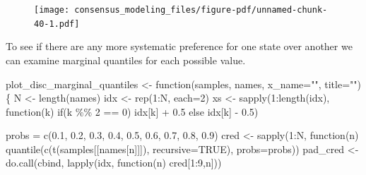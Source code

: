 \documentclass[
  letterpaper,
  DIV=11,
  numbers=noendperiod]{scrartcl}
\newenvironment{Shaded}{\begin{snugshade}}{\end{snugshade}}
\newcommand{\AttributeTok}[1]{\textcolor[rgb]{0.40,0.45,0.13}{#1}}
\newcommand{\ConstantTok}[1]{\textcolor[rgb]{0.56,0.35,0.01}{#1}}
\newcommand{\ControlFlowTok}[1]{\textcolor[rgb]{0.00,0.23,0.31}{#1}}
\newcommand{\DecValTok}[1]{\textcolor[rgb]{0.68,0.00,0.00}{#1}}
\newcommand{\FloatTok}[1]{\textcolor[rgb]{0.68,0.00,0.00}{#1}}
\newcommand{\FunctionTok}[1]{\textcolor[rgb]{0.28,0.35,0.67}{#1}}
\newcommand{\NormalTok}[1]{\textcolor[rgb]{0.00,0.23,0.31}{#1}}
\newcommand{\OtherTok}[1]{\textcolor[rgb]{0.00,0.23,0.31}{#1}}
\newcommand{\SpecialCharTok}[1]{\textcolor[rgb]{0.37,0.37,0.37}{#1}}
\newcommand{\StringTok}[1]{\textcolor[rgb]{0.13,0.47,0.30}{#1}}
\begin{document}
\begin{figure}[H]

{\centering \texttt{[image: consensus\_modeling\_files/figure-pdf/unnamed-chunk-40-1.pdf]}

}

\end{figure}

To see if there are any more systematic preference for one state over
another we can examine marginal quantiles for each possible value.

\begin{Shaded}
\begin{Highlighting}[]
\NormalTok{plot\_disc\_marginal\_quantiles }\OtherTok{\textless{}{-}} \ControlFlowTok{function}\NormalTok{(samples, names,}
                                         \AttributeTok{x\_name=}\StringTok{""}\NormalTok{, }\AttributeTok{title=}\StringTok{""}\NormalTok{) \{}
\NormalTok{  N }\OtherTok{\textless{}{-}} \FunctionTok{length}\NormalTok{(names)}
\NormalTok{  idx }\OtherTok{\textless{}{-}} \FunctionTok{rep}\NormalTok{(}\DecValTok{1}\SpecialCharTok{:}\NormalTok{N, }\AttributeTok{each=}\DecValTok{2}\NormalTok{)}
\NormalTok{  xs }\OtherTok{\textless{}{-}} \FunctionTok{sapply}\NormalTok{(}\DecValTok{1}\SpecialCharTok{:}\FunctionTok{length}\NormalTok{(idx), }\ControlFlowTok{function}\NormalTok{(k) }\ControlFlowTok{if}\NormalTok{(k }\SpecialCharTok{\%\%} \DecValTok{2} \SpecialCharTok{==} \DecValTok{0}\NormalTok{) idx[k] }\SpecialCharTok{+} \FloatTok{0.5}
                                          \ControlFlowTok{else}\NormalTok{            idx[k] }\SpecialCharTok{{-}} \FloatTok{0.5}\NormalTok{)}

\NormalTok{  probs }\OtherTok{=} \FunctionTok{c}\NormalTok{(}\FloatTok{0.1}\NormalTok{, }\FloatTok{0.2}\NormalTok{, }\FloatTok{0.3}\NormalTok{, }\FloatTok{0.4}\NormalTok{, }\FloatTok{0.5}\NormalTok{, }\FloatTok{0.6}\NormalTok{, }\FloatTok{0.7}\NormalTok{, }\FloatTok{0.8}\NormalTok{, }\FloatTok{0.9}\NormalTok{)}
\NormalTok{  cred }\OtherTok{\textless{}{-}} \FunctionTok{sapply}\NormalTok{(}\DecValTok{1}\SpecialCharTok{:}\NormalTok{N, }\ControlFlowTok{function}\NormalTok{(n)}
                      \FunctionTok{quantile}\NormalTok{(}\FunctionTok{c}\NormalTok{(}\FunctionTok{t}\NormalTok{(samples[[names[n]]]),}
                                 \AttributeTok{recursive=}\ConstantTok{TRUE}\NormalTok{),}
                               \AttributeTok{probs=}\NormalTok{probs))}
\NormalTok{  pad\_cred }\OtherTok{\textless{}{-}} \FunctionTok{do.call}\NormalTok{(cbind, }\FunctionTok{lapply}\NormalTok{(idx, }\ControlFlowTok{function}\NormalTok{(n) cred[}\DecValTok{1}\SpecialCharTok{:}\DecValTok{9}\NormalTok{,n]))}


\end{Highlighting}
\end{Shaded}
\end{document}
